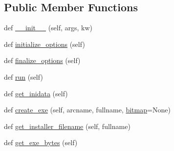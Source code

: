 \subsection*{Public Member Functions}
\begin{DoxyCompactItemize}
\item 
def \hyperlink{classsetuptools_1_1__distutils_1_1command_1_1bdist__wininst_1_1bdist__wininst_a011ceeae320912cb05e509f384c75ecb}{\+\_\+\+\_\+init\+\_\+\+\_\+} (self, args, kw)
\item 
def \hyperlink{classsetuptools_1_1__distutils_1_1command_1_1bdist__wininst_1_1bdist__wininst_a5c52336d1f0cfa24e86e6b61b2684d27}{initialize\+\_\+options} (self)
\item 
def \hyperlink{classsetuptools_1_1__distutils_1_1command_1_1bdist__wininst_1_1bdist__wininst_a987be5e1ce650710a870fec0648f285f}{finalize\+\_\+options} (self)
\item 
def \hyperlink{classsetuptools_1_1__distutils_1_1command_1_1bdist__wininst_1_1bdist__wininst_a399b918d1063236ea5e59a7884033fc6}{run} (self)
\item 
def \hyperlink{classsetuptools_1_1__distutils_1_1command_1_1bdist__wininst_1_1bdist__wininst_af81ebb4cc3cb58e0fbe782368061d3ca}{get\+\_\+inidata} (self)
\item 
def \hyperlink{classsetuptools_1_1__distutils_1_1command_1_1bdist__wininst_1_1bdist__wininst_a9e7d67f7545b8676180d34b97ef3f5d1}{create\+\_\+exe} (self, arcname, fullname, \hyperlink{classsetuptools_1_1__distutils_1_1command_1_1bdist__wininst_1_1bdist__wininst_afe8de6f3c9d3183f10a1eff2cf77b58a}{bitmap}=None)
\item 
def \hyperlink{classsetuptools_1_1__distutils_1_1command_1_1bdist__wininst_1_1bdist__wininst_a289d3fb78dd46330a60e509ea726e63a}{get\+\_\+installer\+\_\+filename} (self, fullname)
\item 
def \hyperlink{classsetuptools_1_1__distutils_1_1command_1_1bdist__wininst_1_1bdist__wininst_a1d35d3fa154035505cccfed0b0619770}{get\+\_\+exe\+\_\+bytes} (self)
\end{DoxyCompactItemize}
